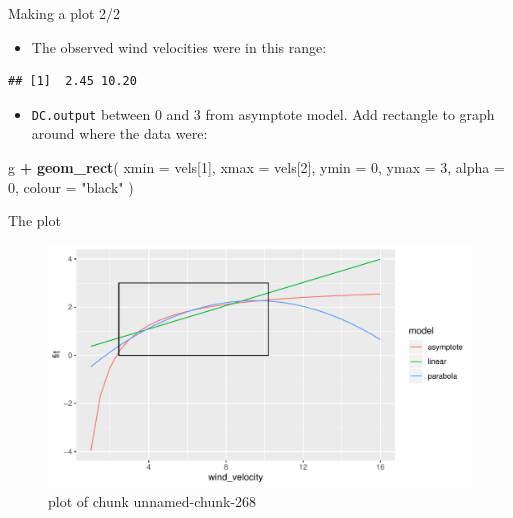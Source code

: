 \documentclass[ignorenonframetext,]{beamer}
\newenvironment{Shaded}{\begin{snugshade}}{\end{snugshade}}
\newcommand{\DataTypeTok}[1]{\textcolor[rgb]{0.13,0.29,0.53}{#1}}
\newcommand{\DecValTok}[1]{\textcolor[rgb]{0.00,0.00,0.81}{#1}}
\newcommand{\KeywordTok}[1]{\textcolor[rgb]{0.13,0.29,0.53}{\textbf{#1}}}
\newcommand{\NormalTok}[1]{#1}
\newcommand{\OperatorTok}[1]{\textcolor[rgb]{0.81,0.36,0.00}{\textbf{#1}}}
\newcommand{\StringTok}[1]{\textcolor[rgb]{0.31,0.60,0.02}{#1}}
\providecommand{\tightlist}{%
  \setlength{\itemsep}{0pt}\setlength{\parskip}{0pt}}
\begin{document}
\begin{frame}[fragile]{Making a plot 2/2}
\protect\hypertarget{making-a-plot-22}{}

\begin{itemize}
\tightlist
\item
  The observed wind velocities were in this range:
\end{itemize}

\begin{Shaded}
\end{Shaded}

\begin{verbatim}
## [1]  2.45 10.20
\end{verbatim}

\begin{itemize}
\tightlist
\item
  \texttt{DC.output} between 0 and 3 from asymptote model. Add rectangle
  to graph around where the data were:
\end{itemize}

\begin{Shaded}
\begin{Highlighting}[]
\NormalTok{g }\OperatorTok{+}\StringTok{ }\KeywordTok{geom_rect}\NormalTok{(}
  \DataTypeTok{xmin =}\NormalTok{ vels[}\DecValTok{1}\NormalTok{], }\DataTypeTok{xmax =}\NormalTok{ vels[}\DecValTok{2}\NormalTok{], }\DataTypeTok{ymin =} \DecValTok{0}\NormalTok{, }\DataTypeTok{ymax =} \DecValTok{3}\NormalTok{,}
  \DataTypeTok{alpha =} \DecValTok{0}\NormalTok{, }\DataTypeTok{colour =} \StringTok{"black"}
\NormalTok{)}
\end{Highlighting}
\end{Shaded}

\end{frame}

\begin{frame}{The plot}
\protect\hypertarget{the-plot-1}{}

\begin{figure}
\centering
\includegraphics{figure/unnamed-chunk-268-1.pdf}
\caption{plot of chunk unnamed-chunk-268}
\end{figure}

\end{frame}
\end{document}
